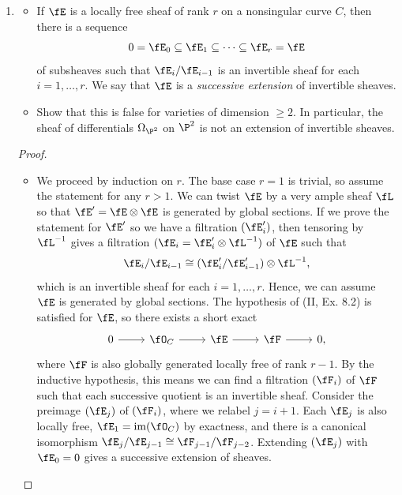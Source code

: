 \documentclass[a4paper]{article}
\begin{document}
\begin{enumerate} [label=\textbf{\arabic*.}, leftmargin=0em]
    \item \begin{itemize}
              \item[(a)] If $\fE$ is a locally free sheaf of rank $r$ on a nonsingular curve $C$, then there is a sequence
                    \begin{equation*}
                        0 = \fE_0 \subseteq \fE_1 \subseteq \cdots \subseteq \fE_r = \fE
                    \end{equation*}
                    of subsheaves such that $\fE_i / \fE_{i - 1}$ is an invertible sheaf for each $i = 1, \dots, r$.
                    We say that $\fE$ is a \textit{successive extension} of invertible sheaves.
              \item[(b)] Show that this is false for varieties of dimension $\geq 2$.
                    In particular, the sheaf of differentials $\Omega_{\P^2}$ on $\P^2$ is not an extension of invertible sheaves.
          \end{itemize}

          \begin{proof} $ $ \vspace{0pt}
              \begin{itemize} [leftmargin=0cm]
                  \item[(a)] We proceed by induction on $r$.
                        The base case $r = 1$ is trivial, so assume the statement for any $r > 1$.
                        We can twist $\fE$ by a very ample sheaf $\fL$ so that $\fE' = \fE \otimes \fE$ is generated by global sections.
                        If we prove the statement for $\fE'$ so we have a filtration $(\fE'_i)$, then tensoring by $\fL^{-1}$ gives a filtration $(\fE_i = \fE'_i \otimes \fL^{-1})$ of $\fE$ such that $$\fE_i / \fE_{i - 1} \cong (\fE_i' / \fE'_{i - 1}) \otimes \fL^{-1},$$
                        which is an invertible sheaf for each $i = 1, \dots, r$.
                        Hence, we can assume $\fE$ is generated by global sections.
                        The hypothesis of (II, Ex. 8.2) is satisfied for $\fE$, so there exists a short exact
                        \[ \begin{tikzcd}
                                0 \arrow[r] & \fO_C \arrow[r] & \fE \arrow[r] & \fF \arrow[r] & 0,
                            \end{tikzcd} \]
                        where $\fF$ is also globally generated locally free of rank $r - 1$.
                        By the inductive hypothesis, this means we can find a filtration $(\fF_i)$ of $\fF$ such that each successive quotient is an invertible sheaf.
                        Consider the preimage $(\fE_j)$ of $(\fF_i)$, where we relabel $j = i + 1$.
                        Each $\fE_j$ is also locally free, $\fE_1 = \im(\fO_C)$ by exactness, and there is a canonical isomorphism $\fE_j / \fE_{j - 1} \cong \fF_{j - 1} / \fF_{j - 2}$.
                        Extending $(\fE_j)$ with $\fE_0 = 0$ gives a successive extension of sheaves.


\end{itemize}
\end{proof}
\end{enumerate}
\end{document}
